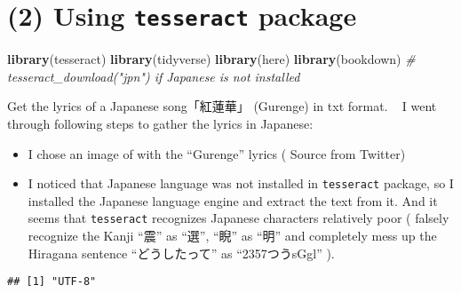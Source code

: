 \documentclass[
]{article}
\newenvironment{Shaded}{\begin{snugshade}}{\end{snugshade}}
\newcommand{\CommentTok}[1]{\textcolor[rgb]{0.56,0.35,0.01}{\textit{#1}}}
\newcommand{\KeywordTok}[1]{\textcolor[rgb]{0.13,0.29,0.53}{\textbf{#1}}}
\newcommand{\NormalTok}[1]{#1}
\begin{document}
\hypertarget{using-tesseract-package}{%
\section{\texorpdfstring{(2) Using \texttt{tesseract}
package}{(2) Using tesseract package}}\label{using-tesseract-package}}

\begin{Shaded}
\begin{Highlighting}[]
\KeywordTok{library}\NormalTok{(tesseract)}
\KeywordTok{library}\NormalTok{(tidyverse)}
\KeywordTok{library}\NormalTok{(here)}
\KeywordTok{library}\NormalTok{(bookdown)}
\CommentTok{# tesseract_download("jpn") if Japanese is not installed}
\end{Highlighting}
\end{Shaded}

Get the lyrics of a Japanese song「紅蓮華」 (Gurenge) in txt format. ~ I
went through following steps to gather the lyrics in Japanese:

\begin{itemize}
\item
  I chose an image of with the ``Gurenge'' lyrics ( Source from Twitter)
\item
  I noticed that Japanese language was not installed in
  \texttt{tesseract} package, so I installed the Japanese language
  engine and extract the text from it. And it seems that
  \texttt{tesseract} recognizes Japanese characters relatively poor (
  falsely recognize the Kanji ``震'' as ``選'', ``睨'' as ``明'' and
  completely mess up the Hiragana sentence ``どうしたって'' as
  ``2357つうsGgl'' ).
\end{itemize}

\begin{verbatim}
## [1] "UTF-8"
\end{verbatim}
\end{document}
